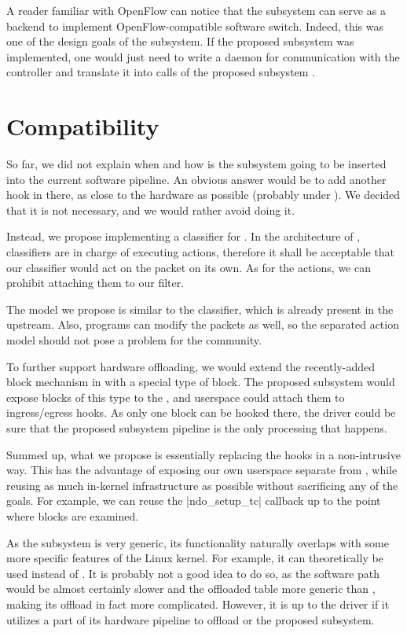 A reader familiar with OpenFlow can notice that the subsystem can serve as
a backend to implement OpenFlow-compatible software switch. Indeed, this was
one of the design goals of the subsystem. If the proposed subsystem was
implemented, one would just need to write a daemon for communication with the
 controller and translate it into calls of the proposed subsystem
.

\section{Compatibility}
\label{rfc:tc}

So far, we did not explain when and how is the subsystem going to be inserted
into the current software pipeline. An obvious answer would be to add another
hook in there, as close to the hardware as possible (probably under ). We
decided that it is not necessary, and we would rather avoid doing it.

Instead, we propose implementing a classifier for . In the architecture
of , classifiers are in charge of executing actions, therefore it shall
be acceptable that our classifier would act on the packet on its own. As for
the  actions, we can prohibit attaching them to our filter.

The model we propose is similar to the  classifier, which is already present
in the upstream. Also,  programs can modify the packets as well, so the
separated action model should not pose a problem for the community.

To further support hardware offloading, we would extend the recently-added
block mechanism in  with a special type of block. The proposed subsystem
would expose blocks of this type to the , and userspace could attach them
to  ingress/egress hooks. As only one block can be hooked there, the
driver could be sure that the proposed subsystem pipeline is the only
processing that happens.

Summed up, what we propose is essentially replacing the  hooks in
a non-intrusive way. This has the advantage of exposing our own userspace
 separate from , while reusing as much in-kernel infrastructure as
possible without sacrificing any of the goals. For example, we can reuse the
\fnc|ndo_setup_tc| callback up to the point where blocks are examined.


As the subsystem is very generic, its functionality naturally overlaps with
some more specific features of the Linux kernel. For example, it can
theoretically be used instead of . It is probably not a good idea to do
so, as the software path would be almost certainly slower and the offloaded
table more generic than , making its offload in fact more complicated.
However, it is up to the driver if it utilizes a part of its hardware pipeline
to offload  or the proposed subsystem.

